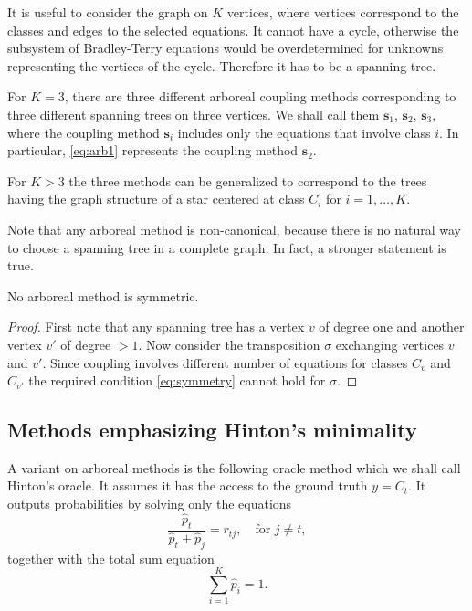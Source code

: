 It is useful to consider the graph on $K$ vertices, where vertices correspond to the classes and edges to the selected equations. It cannot have a cycle, otherwise the subsystem of Bradley-Terry equations would be overdetermined for unknowns representing the vertices of the cycle. Therefore it has to be a spanning tree.

For $K=3$, there are three different arboreal coupling methods corresponding to three different spanning trees on three vertices. We shall call them $\boldsymbol{s}_1$, $\boldsymbol{s}_2$, $\boldsymbol{s}_3$, where the coupling method $\boldsymbol{s}_i$ includes only the equations that involve class $i$. In particular, \eqref{eq:arb1} represents the coupling method $\boldsymbol{s}_2$.

For $K>3$ the three methods can be generalized to correspond to the trees having the graph structure  of a star centered at class $C_i$ for $i=1, \ldots, K$.


Note that any arboreal method is non-canonical, because there is no natural way to choose a spanning tree in a complete graph. 
In fact, a stronger statement is true.
\begin{prop}
No arboreal method is symmetric. 
\end{prop}
\begin{proof}
First note that any spanning tree has a vertex $v$ of degree one and another vertex $v'$ of degree $>1$. Now consider the transposition $\sigma$ exchanging  vertices $v$  and $v'$. Since coupling involves different number of equations for classes $C_v$ and $C_{v'}$ the required condition \eqref{eq:symmetry} cannot hold for $\sigma$.
\end{proof}


\subsection{Methods emphasizing Hinton's minimality}

A variant on arboreal methods is the following oracle method which we shall call Hinton's oracle. It  assumes it has the access to the ground truth $y = C_t$. It outputs probabilities by solving only the equations
$$
\frac{\hat p_t}{\hat p_t + \hat p_j} = {r}_{tj},\quad \textrm{for }j\not = t,
$$
together   with the total sum equation
$$
\sum_{i=1}^K  \hat p_i = 1.
$$

